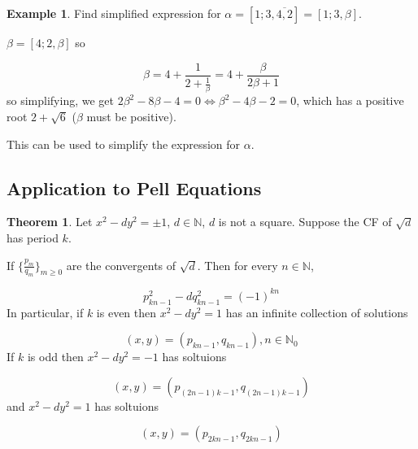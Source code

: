 \documentclass[12pt,a4paper]{article}
\theoremstyle{definition}
\newtheorem{theorem}[definition]{Theorem}
\newtheorem{example}[definition]{Example}
\begin{document}
\begin{example}
	Find simplified expression for $\alpha = [1; 3, \overline{4, 2}] = [1; 3, \beta]$.

	$\beta = [4; 2, \beta]$ so

	\[ \beta = 4 + \frac{1}{2 + \frac{1}{\beta}} = 4 + \frac{\beta}{2 \beta + 1} \]
	so simplifying, we get $ 2\beta^2 - 8\beta - 4 = 0 \Leftrightarrow \beta^2 - 4\beta - 2 = 0$, which has a positive root $2 + \sqrt{6}$ ($\beta$ must be positive).

	This can be used to simplify the expression for $\alpha$.
\end{example}

\subsection{Application to Pell Equations}

\begin{theorem}
	Let $x^2 - d y^2 = \pm 1$, $d \in \mathbb{N}$, $d$ is not a square. Suppose the CF of $\sqrt{d}$ has period $k$.

	If $\{\frac{p_m}{q_m}\}_{m \ge 0}$ are the convergents of $\sqrt{d}$. Then for every $n \in \mathbb{N}$,

	\[ p_{kn - 1}^2 - d q_{kn - 1}^2 = {(-1)}^{k n} \]
	In particular, if $k$ is even then $x^2 - d y^2 = 1$ has an infinite collection of solutions

	\[ (x, y) = (p_{kn - 1}, q_{kn - 1}), n \in \mathbb{N}_0 \]
	If $k$ is odd then $x^2 - d y^2 = -1$ has soltuions

	\[ (x, y) = (p_{(2n - 1)k - 1}, q_{(2n - 1)k - 1}) \]
	and $x^2 - dy^2 = 1$ has soltuions

	\[ (x, y) = (p_{2kn - 1}, q_{2kn - 1}) \]
\end{theorem}
\end{document}
